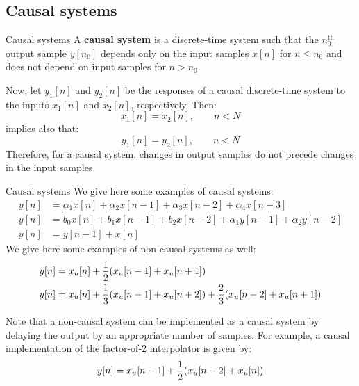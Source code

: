\documentclass[../../main/main.tex]{subfiles}
\begin{document}
\subsection{Causal systems}
\begin{definition}{Causal systems}{}
    A \textbf{causal system} is a discrete-time system such that the \( n_{0}^{\text{th}} \) output sample \( y[n_{0}] \) depends only on the input samples \( x[n] \) for \( n \le n_{0} \) and does not depend on input samples for \( n > n_{0} \).
\end{definition}

Now, let \( y_{1}[n] \) and \( y_{2}[n] \) be the responses of a causal discrete-time system to the inputs \( x_{1}[n] \) and \( x_{2}[n] \), respectively. Then:
\begin{equation}
    x_{1}[n]
    =
    x_{2}[n],
    \qquad
    n < N
    \label{eq:L03_S36_1}
\end{equation}
implies also that:
\begin{equation}
    y_{1}[n]
    =
    y_{2}[n],
    \qquad
    n < N
    \label{eq:L03_S36_2}
\end{equation}
Therefore, for a causal system, changes in output samples do not precede changes in the input samples.

\begin{example}{Causal systems}{}
    We give here some examples of causal systems:
    \begin{align}
        y[n]
        &=
            \alpha_{1}x[n] + \alpha_{2}x[n-1] + \alpha_{3}x[n-2] + \alpha_{4}x[n-3] \\
        y[n]
        &=
            b_{0}x[n] + b_{1}x[n-1] + b_{2}x[n-2] + \alpha_{1}y[n-1] + \alpha_{2}y[n-2] \\
        y[n]
        &=
            y[n-1] + x[n]
    \end{align}
    We give here some examples of non-causal systems as well:
    \begin{align}
        y[n]
        &=
            x_{u}[n] + \frac{1}{2} \qty(x_{u}[n-1] + x_{u}[n+1])    \\
        y[n]
        &=
            x_{u}[n] + \frac{1}{3} \qty(x_{u}[n-1] + x_{u}[n+2]) + \frac{2}{3} \qty(x_{u}[n-2] + x_{u}[n+1])
    \end{align}
\end{example}

Note that a non-causal system can be implemented as a causal system by delaying the output by an appropriate number of samples. For example, a causal implementation of the factor-of-2 interpolator is given by:
\begin{equation}
    y[n]
    =
    x_{u}[n-1] + \frac{1}{2} \qty(x_{u}[n-2] + x_{u}[n])
    \label{eq:L03_S38_1}
\end{equation}
\end{document}
